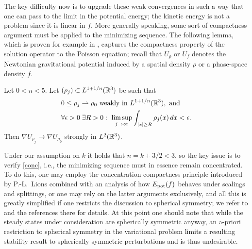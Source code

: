 \documentclass[11pt]{article}
\begin{document}
The key difficulty now is to upgrade these weak convergences in such a way
that one can pass to the limit in the potential energy; the kinetic energy
is not a problem since it is linear in $f$. More generally speaking, some
sort of compactness argument must be applied to the minimizing sequence.
The following lemma, which is proven for example in \cite[Lemma~2.5]{Rein07},
captures the compactness property of the solution operator to
the Poisson equation; recall that $U_\rho$ or $U_f$ denotes the
Newtonian gravitational potential induced by a spatial density
$\rho$ or a phase-space density $f$. 
\begin{lemma} \label{concimplcomp}
  Let $0<n<5$. Let $(\rho_j) \subset L^{1+1/n} (\mathbb R^3)$ be such that
  \begin{align} \label{conc}
    &
    0\leq \rho_j \rightharpoonup \rho_0 \
    \mbox{weakly in}\  L^{1+1/n} (\mathbb R^3), \ \mbox{and}\nonumber \\
    &
    \forall \epsilon > 0 \;\exists R>0 :\
    \limsup_{j\to \infty} \int_{|x|\geq R} \rho_j(x)\, dx < \epsilon  .
  \end{align}
  Then 
  $\nabla U_{\rho_j} \to \nabla U_{\rho_0}$ strongly in $L^2(\mathbb R^3)$.
\end{lemma}
%
Under our assumption on $k$ it holds that $n=k+3/2 <3$, so the key issue is to
verify \eqref{conc}, i.e., the minimizing sequence must in
essence remain concentrated.
To do this, one may employ the concentration-compactness principle introduced
by {\sc P.-L.~Lions} \cite{Lions} combined with an analysis of how $E_\mathrm{pot}(f)$
behaves under scalings and splittings, or one may rely on the latter
arguments exclusively, and all this is greatly simplified if one restricts
the discussion to spherical
symmetry; we refer to \cite{Rein07} and the references there for details.
At this point one should note that while the steady states under consideration
are spherically symmetric anyway, an a-priori restriction to spherical
symmetry in the variational problem
limits a resulting stability result to spherically symmetric
perturbations and is thus undesirable.
\end{document}
